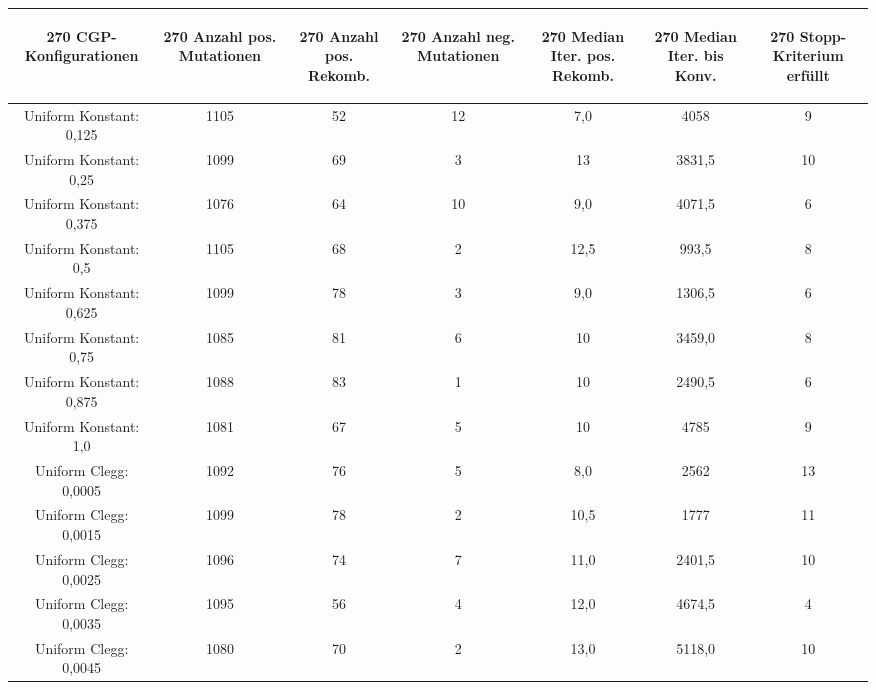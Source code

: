 \begin{table}[H]
	\centering
	\begin{tabular}{c | c | c | c | c | c | c}
		\begin{turn}{270} \textbf{CGP-Konfigurationen} \end{turn} & \begin{turn}{270} \textbf{Anzahl pos. Mutationen} \end{turn} & \begin{turn}{270} \textbf{Anzahl pos. Rekomb.} \end{turn} & \begin{turn}{270} \textbf{Anzahl neg. Mutationen} \end{turn} & \begin{turn}{270} \textbf{Median Iter. pos. Rekomb.} \end{turn} & \begin{turn}{270} \textbf{Median Iter. bis Konv.} \end{turn} & \begin{turn}{270} \textbf{Stopp-Kriterium erfüllt} \end{turn}\\
		\hline
		Uniform Konstant: 0,125 & 1105 & 52 & 12 & 7,0 & 4058 & 9\\
		\hline
		Uniform Konstant: 0,25 & 1099 & 69 & 3 & 13 & 3831,5 & 10\\
		\hline
		Uniform Konstant: 0,375 & 1076 & 64 & 10 & 9,0 & 4071,5 & 6\\
		\hline
		Uniform Konstant: 0,5 & 1105 & 68 & 2 & 12,5 & 993,5 & 8\\
		\hline
		Uniform Konstant: 0,625 & 1099 & 78 & 3 & 9,0 & 1306,5 & 6\\
		\hline
		Uniform Konstant: 0,75 & 1085 & 81 & 6 & 10 & 3459,0 & 8\\
		\hline
		Uniform Konstant: 0,875 & 1088 & 83 & 1 & 10 & 2490,5 & 6\\
		\hline
		Uniform Konstant: 1,0 & 1081 & 67 & 5 & 10 & 4785 & 9\\
		\hline
		Uniform Clegg: 0,0005 & 1092 & 76 & 5 & 8,0 & 2562 & 13\\
		\hline
		Uniform Clegg: 0,0015 & 1099 & 78 & 2 & 10,5 & 1777 & 11\\
		\hline
		Uniform Clegg: 0,0025 & 1096 & 74 & 7 & 11,0 & 2401,5 & 10\\
		\hline
		Uniform Clegg: 0,0035 & 1095 & 56 & 4 & 12,0 & 4674,5 & 4\\
		\hline
		Uniform Clegg: 0,0045 & 1080 & 70 & 2 & 13,0 & 5118,0 & 10\\

\end{tabular}
\end{table}
